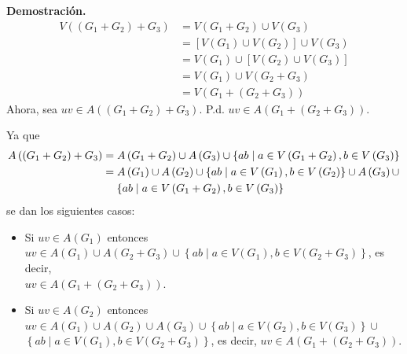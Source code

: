 \documentclass[fleqn]{article}
\begin{document}
\begin{enumerate}[a)]
        \textbf{Demostración.}
        \begin{align*}
            V \left( \left( G_1 + G_2 \right) + G_3 \right) &= V \left( G_1 + G_2 \right) \cup V \left( G_3 \right) \\
            &= \left[ V \left( G_1 \right) \cup V \left( G_2 \right) \right] \cup V \left( G_3 \right) \\
            &= V \left( G_1 \right) \cup \left[ V \left( G_2 \right) \cup V \left( G_3 \right) \right] \\
            &= V \left( G_1 \right) \cup V \left( G_2 + G_3 \right) \\
            &= V \left( G_1 + \left( G_2 + G_3 \right) \right)
        \end{align*}
        Ahora, sea $ uv \in A \left( \left( G_1 + G_2 \right) + G_3 \right) $. P.d. $ uv \in A \left( G_1 + \left( G_2 + G_3 \right) \right) $.

        Ya que 
        \begin{align*}
            A \left( \left( G_1 + G_2 \right) + G_3 \right) &= A \left( G_1 + G_2 \right) \cup A \left( G_3 \right) \cup \left\lbrace ab \mid a \in V \left( G_1 + G_2 \right), b \in V \left( G_3 \right) \right\rbrace \\
            &= A \left( G_1 \right) \cup A \left( G_2 \right) \cup \left\lbrace ab \mid a \in V \left( G_1 \right), b \in V \left( G_2 \right) \right\rbrace \cup A \left( G_3 \right) \cup \\
            & \hspace{4mm} \left\lbrace ab \mid a \in V \left( G_1 + G_2 \right), b \in V \left( G_3 \right) \right\rbrace
        \end{align*}
        se dan los siguientes casos:

        \begin{itemize}
            \item Si $ uv \in A \left( G_1 \right) $ entonces $ uv \in A \left( G_1 \right) \cup A \left( G_2 + G_3 \right) \cup \left\lbrace ab \mid a \in V \left( G_1 \right), b \in V \left( G_2 + G_3 \right) \right\rbrace $, es decir, \\ $ uv \in A \left( G_1 + \left( G_2 + G_3 \right) \right) $.
            
            \item Si $ uv \in A \left( G_2 \right) $ entonces $ uv \in A \left( G_1 \right) \cup A \left( G_2 \right) \cup A \left( G_3 \right) \cup \left\lbrace ab \mid a \in V \left( G_2 \right), b \in V \left( G_3 \right) \right\rbrace \cup $ \\ $ \left\lbrace ab \mid a \in V \left( G_1 \right), b \in V \left( G_2 + G_3 \right) \right\rbrace $, es decir, $ uv \in A \left( G_1 + \left( G_2 + G_3 \right) \right) $.
            

\end{itemize}
\end{enumerate}
\end{document}

